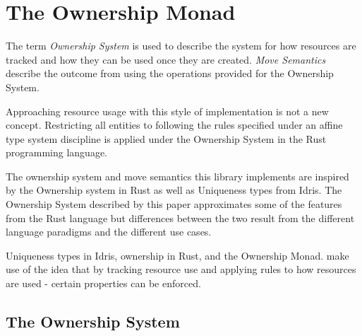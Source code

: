 \documentclass[onehalf,11pt]{beavtex}
\begin{document}



\chapter{The Ownership Monad}

The term \textit{Ownership System} is used to describe the system for how
resources are tracked and how they can be used once they are created.
\textit{Move Semantics} describe the outcome from using the operations provided
for the Ownership System.

Approaching resource usage with this style of implementation is not a new
concept. Restricting all entities to following the rules specified under an
affine type system discipline is applied under the Ownership System in the Rust
programming language. 

The ownership system and move semantics this library
implements are inspired by the Ownership system in Rust as well as
Uniqueness types from Idris.\cite{rust_book_ownership} \cite{idris_uniqueness_types}
The Ownership System described by this paper approximates some of the
features from the Rust language but differences between the two result from the
different language paradigms and the different use cases.

Uniqueness types in Idris, ownership in Rust, and the Ownership Monad.
make use of the idea that by tracking resource use and applying rules to how
resources are used - certain properties can be enforced.


\section{The Ownership System}
\end{document}
